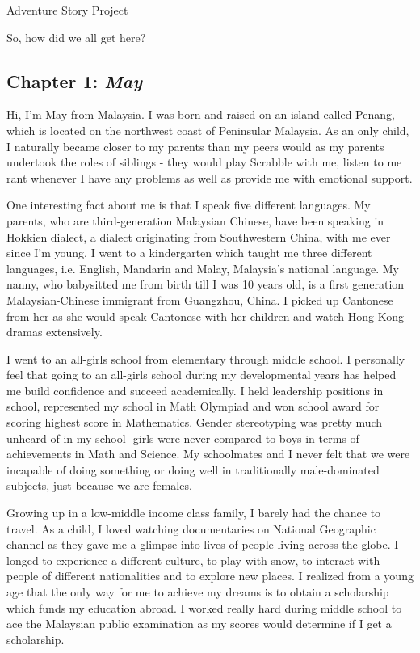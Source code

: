 \documentclass{article}
\begin{document}
\Huge Adventure Story Project

\huge So, how did we all get here?

\normalsize

\subsection*{Chapter 1: \textit{May}}

Hi, I'm May from Malaysia. I was born and raised on an island called Penang, which is located on the northwest coast of Peninsular  Malaysia. As an only child, I naturally became closer to my parents than my peers would as my parents undertook the roles of siblings - they would play Scrabble with me, listen to me rant whenever I have any problems as well as provide me with emotional support. 

One interesting fact about me is that I speak five different languages. My parents, who are third-generation Malaysian Chinese, have been speaking in Hokkien dialect, a dialect originating from Southwestern China,  with me ever since I’m young. I went to a kindergarten which taught me three different languages, i.e. English, Mandarin and Malay, Malaysia’s national language. My nanny, who babysitted me from birth till I was 10 years old, is a first generation Malaysian-Chinese immigrant from Guangzhou, China.  I picked up Cantonese from her as she would speak Cantonese with her children and watch Hong Kong dramas extensively. 

I went to an all-girls school from elementary through middle school. I personally feel that going to an all-girls school during my developmental years has helped me build confidence and succeed academically. I held leadership positions in school, represented my school in Math Olympiad and won school award for scoring highest score in Mathematics. Gender stereotyping was pretty much unheard of in my school- girls were never compared to boys in terms of achievements in Math and Science. My schoolmates and I never felt that we were incapable of doing something or doing well in traditionally male-dominated subjects, just because we are females. 

Growing up in a low-middle income class family, I barely had the chance to travel. As a child, I loved watching documentaries on National Geographic channel as they gave me a glimpse into lives of people living across the globe. I longed to experience a different culture, to play with snow, to interact with people of different nationalities and to explore new places. I realized from a young age that the only way for me to achieve my dreams is to obtain a scholarship which funds my education abroad. I worked really hard during middle school to ace the Malaysian public examination as my scores would determine if I get a scholarship. 
\end{document}
